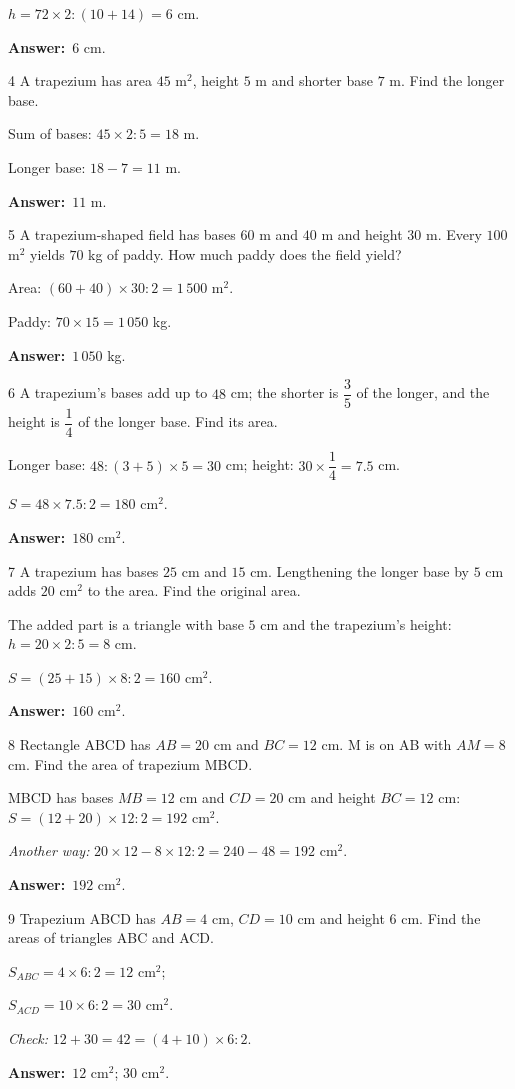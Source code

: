 \documentclass[11pt]{article}
\newif\ifsol \solfalse
\providecommand{\AnsWord}{Đáp số}
\newcommand{\dapso}[1]{\par\textbf{\AnsWord:}\ #1}
\newcommand{\probsol}[1]{%
  \begin{lrbox}{\solmeasure}\begin{minipage}{\dimexpr\linewidth-24pt\relax}#1\end{minipage}\end{lrbox}%
  \ifsol
    \begin{solbox}#1\end{solbox}%
  \else
    \setlength{\solht}{\dimexpr\ht\solmeasure+\dp\solmeasure+0.85cm\relax}%
    \ifdim\solht<1.35cm\setlength{\solht}{1.35cm}\fi
    \begin{tcolorbox}[colback=white,colframe=Line,boxrule=0.8pt,arc=5pt,
      left=8pt,right=8pt,top=4pt,bottom=4pt,height=\solht]{\footnotesize\color{Slate}\itshape\WorkWord}\end{tcolorbox}%
  \fi}
\newcommand{\gap}{\vspace{0.3cm}}
\def\WorkWord{Your work:}
\def\AnsWord{Answer}
\begin{document}
\probsol{
$h=72\times2:(10+14)=6$ cm.
\dapso{$6$ cm.}}
\gap
\begin{probbox}{4}{\relax}
A trapezium has area $45$ m$^2$, height $5$ m and shorter base $7$ m. Find the longer base.
\end{probbox}
\probsol{
Sum of bases: $45\times2:5=18$ m.\par Longer base: $18-7=11$ m.
\dapso{$11$ m.}}
\gap
\begin{probbox}{5}{\relax}
A trapezium-shaped field has bases $60$ m and $40$ m and height $30$ m. Every $100$ m$^2$ yields $70$ kg of paddy. How much paddy does the field yield?
\end{probbox}
\probsol{
Area: $(60+40)\times30:2=1\,500$ m$^2$.\par Paddy: $70\times15=1\,050$ kg.
\dapso{$1\,050$ kg.}}
\gap
\begin{probbox}{6}{\relax}
A trapezium's bases add up to $48$ cm; the shorter is $\dfrac35$ of the longer, and the height is $\dfrac14$ of the longer base. Find its area.
\end{probbox}
\probsol{
Longer base: $48:(3+5)\times5=30$ cm; height: $30\times\dfrac14=7.5$ cm.\par $S=48\times7.5:2=180$ cm$^2$.
\dapso{$180$ cm$^2$.}}
\gap
\begin{probbox}{7}{\relax}
A trapezium has bases $25$ cm and $15$ cm. Lengthening the longer base by $5$ cm adds $20$ cm$^2$ to the area. Find the original area.
\end{probbox}
\probsol{
The added part is a triangle with base $5$ cm and the trapezium's height: $h=20\times2:5=8$ cm.\par $S=(25+15)\times8:2=160$ cm$^2$.
\dapso{$160$ cm$^2$.}}
\gap
\begin{probbox}{8}{\relax}
Rectangle ABCD has $AB=20$ cm and $BC=12$ cm. M is on AB with $AM=8$ cm. Find the area of trapezium MBCD.
\end{probbox}
\probsol{
MBCD has bases $MB=12$ cm and $CD=20$ cm and height $BC=12$ cm: $S=(12+20)\times12:2=192$ cm$^2$.\par
\emph{Another way:} $20\times12-8\times12:2=240-48=192$ cm$^2$.
\dapso{$192$ cm$^2$.}}
\gap
\begin{probbox}{9}{\relax}
Trapezium ABCD has $AB=4$ cm, $CD=10$ cm and height $6$ cm. Find the areas of triangles ABC and ACD.
\end{probbox}
\probsol{
$S_{ABC}=4\times6:2=12$ cm$^2$;\par $S_{ACD}=10\times6:2=30$ cm$^2$.\par \emph{Check:} $12+30=42=(4+10)\times6:2$.
\dapso{$12$ cm$^2$; $30$ cm$^2$.}}
\end{document}
